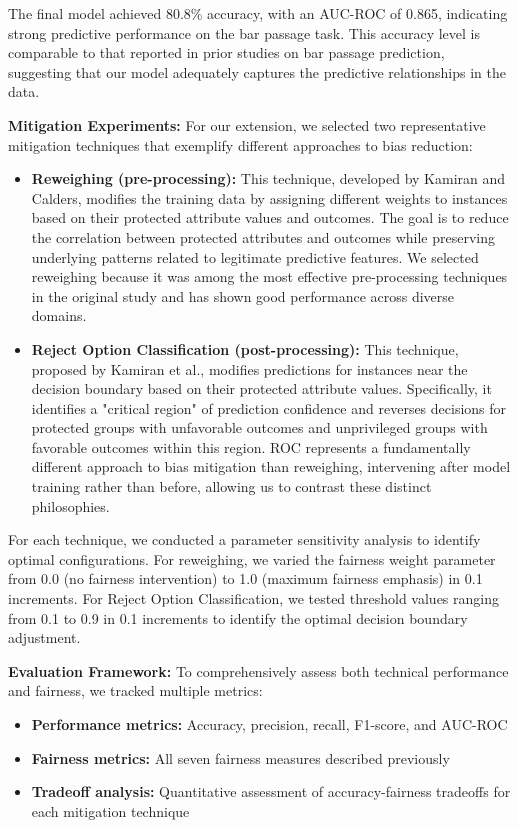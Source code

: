 \documentclass[10pt,journal,compsoc]{IEEEtran}
\begin{document}
The final model achieved 80.8\% accuracy, with an AUC-ROC of 0.865, indicating strong predictive performance on the bar passage task. This accuracy level is comparable to that reported in prior studies on bar passage prediction, suggesting that our model adequately captures the predictive relationships in the data.

\textbf{Mitigation Experiments:} For our extension, we selected two representative mitigation techniques that exemplify different approaches to bias reduction:

\begin{itemize}
\item \textbf{Reweighing (pre-processing):} This technique, developed by Kamiran and Calders\cite{5}, modifies the training data by assigning different weights to instances based on their protected attribute values and outcomes. The goal is to reduce the correlation between protected attributes and outcomes while preserving underlying patterns related to legitimate predictive features. We selected reweighing because it was among the most effective pre-processing techniques in the original study and has shown good performance across diverse domains.

\item \textbf{Reject Option Classification (post-processing):} This technique, proposed by Kamiran et al.\cite{20}, modifies predictions for instances near the decision boundary based on their protected attribute values. Specifically, it identifies a "critical region" of prediction confidence and reverses decisions for protected groups with unfavorable outcomes and unprivileged groups with favorable outcomes within this region. ROC represents a fundamentally different approach to bias mitigation than reweighing, intervening after model training rather than before, allowing us to contrast these distinct philosophies.
\end{itemize}

For each technique, we conducted a parameter sensitivity analysis to identify optimal configurations. For reweighing, we varied the fairness weight parameter from 0.0 (no fairness intervention) to 1.0 (maximum fairness emphasis) in 0.1 increments. For Reject Option Classification, we tested threshold values ranging from 0.1 to 0.9 in 0.1 increments to identify the optimal decision boundary adjustment.

\textbf{Evaluation Framework:} To comprehensively assess both technical performance and fairness, we tracked multiple metrics:
\begin{itemize}
\item \textbf{Performance metrics:} Accuracy, precision, recall, F1-score, and AUC-ROC
\item \textbf{Fairness metrics:} All seven fairness measures described previously
\item \textbf{Tradeoff analysis:} Quantitative assessment of accuracy-fairness tradeoffs for each mitigation technique
\end{itemize}
\end{document}
